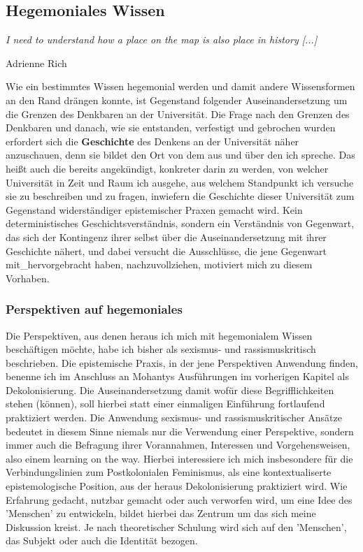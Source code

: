 \subsection{Hegemoniales Wissen}
\epigraph{\textit{ 
I need to understand how a place on the map is also place in history [...]
}}{Adrienne Rich \footnotemark}  

Wie ein bestimmtes Wissen hegemonial werden und damit andere Wissensformen an
den Rand drängen konnte, ist Gegenstand folgender Auseinandersetzung um die
Grenzen des Denkbaren an der Universität. Die Frage nach den Grenzen des
Denkbaren und danach, wie sie entstanden, verfestigt und gebrochen wurden
erfordert sich die \textbf{Geschichte} des Denkens an der Universität näher anzuschauen,
denn sie bildet den Ort von dem aus und über den ich spreche. Das heißt auch
die bereits angekündigt, konkreter darin zu werden, von welcher Universität in
Zeit und Raum ich ausgehe, aus welchem Standpunkt ich versuche sie zu
beschreiben und zu fragen, inwiefern die Geschichte dieser Universität zum
Gegenstand widerständiger epistemischer Praxen gemacht wird. Kein
deterministisches Geschichtsverständnis, sondern ein Verständnis von Gegenwart,
das sich der Kontingenz ihrer selbst über die Auseinandersetzung mit ihrer
Geschichte nähert, und dabei versucht die Ausschlüsse, die jene Gegenwart
mit\_hervorgebracht haben, nachzuvollziehen, motiviert mich zu diesem Vorhaben. 
\subsubsection{Perspektiven auf hegemoniales}

Die Perspektiven, aus denen heraus ich mich mit  hegemonialem Wissen
beschäftigen möchte, habe ich bisher als sexismus- und rassismuskritisch
beschrieben. Die epistemische Praxis, in der jene Perspektiven Anwendung
finden,  benenne ich im Anschluss an Mohantys Ausführungen im vorherigen
Kapitel als Dekolonisierung. Die Auseinandersetzung damit wofür diese
Begrifflichkeiten stehen (können), soll hierbei statt einer einmaligen
Einführung fortlaufend praktiziert werden. Die Anwendung sexismus- und
rassismuskritischer Ansätze bedeutet in diesem Sinne niemals nur die Verwendung
einer Perspektive, sondern immer auch die Befragung ihrer Vorannahmen,
Interessen und Vorgehensweisen, also einem learning on the way. Hierbei
interessiere ich mich insbesondere für die Verbindungslinien zum Postkolonialen
Feminismus, als eine kontextualiserte epistemologische Position, aus der heraus
Dekolonisierung praktiziert wird. Wie Erfahrung gedacht, nutzbar gemacht oder
auch verworfen wird, um eine Idee des 'Menschen' zu entwickeln, bildet hierbei
das Zentrum um das sich meine Diskussion kreist. Je nach theoretischer Schulung
wird sich auf den 'Menschen', das Subjekt oder auch die Identität bezogen.

